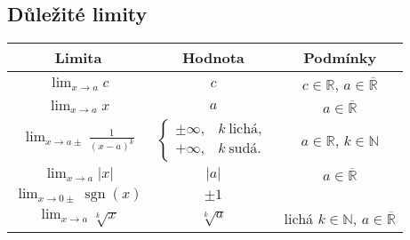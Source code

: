 \vspace{1em}

\noindent\begin{minipage}{\linewidth}
    \subsection*{Důležité limity}

    \centering
    \begin{tabular}{|c|c|c|}
        \hline
        \textbf{Limita}                                                        & \textbf{Hodnota}                                                                        & \textbf{Podmínky}                                                   \\
        \hline
        $\displaystyle\lim_{x\to a} c$                                        & $c$                                                                                    & $c \in \mathbb{R}$, $a \in \overline{\mathbb{R}}$                     \\
        $\displaystyle\lim_{x\to a} x$                                        & $a$                                                                                    & $a \in \overline{\mathbb{R}}$                                         \\
        $\displaystyle\lim_{x\to a\pm} \frac{1}{(x-a)^k}$                     & $\begin{cases} \pm\infty, & k \ \text{lichá}, \\ +\infty, & k \ \text{sudá}.\end{cases}$ & $a \in \mathbb{R}$, $k \in \mathbb{N}$                                \\
        $\displaystyle\lim_{x\to a} |x|$                                      & $|a|$                                                                                  & $a \in \overline{\mathbb{R}}$                                         \\
        $\displaystyle\lim_{x\to0\pm} \operatorname{sgn}(x)$                  & $\pm 1$                                                                                &                                                                       \\
        $\displaystyle\lim_{x\to a} \sqrt[k]{x}$                              & $\sqrt[k]{a}$                                                                          & lichá $k \in \mathbb{N}$, $a \in \overline{\mathbb{R}}$                 \\

\end{tabular}
\end{minipage}
